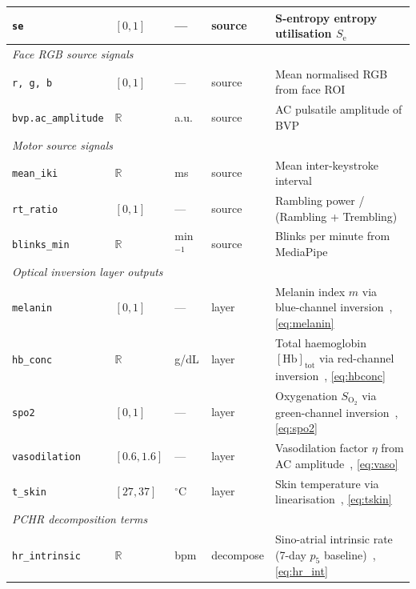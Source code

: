 \documentclass[10pt,twocolumn,a4paper]{article}
\theoremstyle{definition}
\theoremstyle{remark}
\newcommand{\SE}{S_{\mathrm{e}}}
\newcommand{\vaso}{\eta}
\newcommand{\melan}{m}
\newcommand{\Hbconc}{[\mathrm{Hb}]_{\mathrm{tot}}}
\newcommand{\Soxy}{S_{\mathrm{O_2}}}
\begin{document}
\begin{table}[ht]
\begin{tabularx}{\textwidth}{llllX}
\texttt{se}             & $[0,1]$      & —         & source & S-entropy entropy utilisation $\SE$~\cite{sachikonye2024disambiguation} \\
\midrule
\multicolumn{5}{l}{\textit{Face RGB source signals}} \\
\texttt{r, g, b}        & $[0,1]$      & —         & source & Mean normalised RGB from face ROI~\cite{sachikonye2024optical} \\
\texttt{bvp.ac\_amplitude} & $\mathbb{R}$ & a.u.   & source & AC pulsatile amplitude of BVP~\cite{sachikonye2024optical} \\
\midrule
\multicolumn{5}{l}{\textit{Motor source signals}} \\
\texttt{mean\_iki}      & $\mathbb{R}$ & ms        & source & Mean inter-keystroke interval~\cite{sachikonye2024motor} \\
\texttt{rt\_ratio}      & $[0,1]$      & —         & source & Rambling power / (Rambling + Trembling)~\cite{sachikonye2024posture} \\
\texttt{blinks\_min}    & $\mathbb{R}$ & min$^{-1}$& source & Blinks per minute from MediaPipe~\cite{sachikonye2024optical} \\
\midrule
\multicolumn{5}{l}{\textit{Optical inversion layer outputs}} \\
\texttt{melanin}        & $[0,1]$      & —         & layer  & Melanin index $\melan$ via blue-channel inversion~\cite{sachikonye2024optical}, \cref{eq:melanin} \\
\texttt{hb\_conc}       & $\mathbb{R}$ & g/dL      & layer  & Total haemoglobin $\Hbconc$ via red-channel inversion~\cite{sachikonye2024optical}, \cref{eq:hbconc} \\
\texttt{spo2}           & $[0,1]$      & —         & layer  & Oxygenation $\Soxy$ via green-channel inversion~\cite{sachikonye2024optical}, \cref{eq:spo2} \\
\texttt{vasodilation}   & $[0.6,1.6]$  & —         & layer  & Vasodilation factor $\vaso$ from AC amplitude~\cite{sachikonye2024optical}, \cref{eq:vaso} \\
\texttt{t\_skin}        & $[27,37]$    & ${}^\circ$C & layer & Skin temperature via linearisation~\cite{sachikonye2024optical,sachikonye2024disambiguation}, \cref{eq:tskin} \\
\midrule
\multicolumn{5}{l}{\textit{PCHR decomposition terms}} \\
\texttt{hr\_intrinsic}  & $\mathbb{R}$ & bpm       & decompose & Sino-atrial intrinsic rate (7-day $p_5$ baseline)~\cite{sachikonye2024disambiguation}, \cref{eq:hr_int} \\

\end{tabularx}
\end{table}
\end{document}

